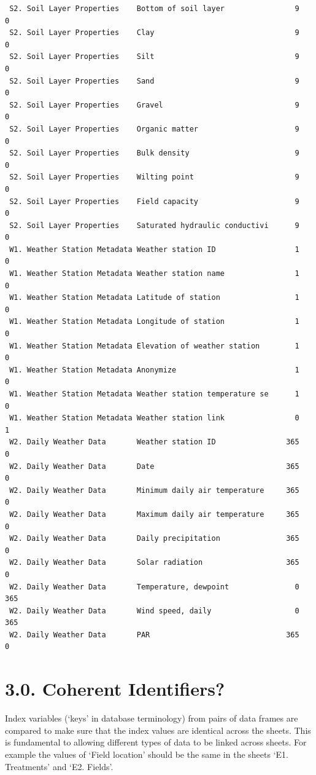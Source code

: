 \documentclass[
]{article}
\begin{document}
\begin{verbatim}
 S2. Soil Layer Properties    Bottom of soil layer                9       0
 S2. Soil Layer Properties    Clay                                9       0
 S2. Soil Layer Properties    Silt                                9       0
 S2. Soil Layer Properties    Sand                                9       0
 S2. Soil Layer Properties    Gravel                              9       0
 S2. Soil Layer Properties    Organic matter                      9       0
 S2. Soil Layer Properties    Bulk density                        9       0
 S2. Soil Layer Properties    Wilting point                       9       0
 S2. Soil Layer Properties    Field capacity                      9       0
 S2. Soil Layer Properties    Saturated hydraulic conductivi      9       0
 W1. Weather Station Metadata Weather station ID                  1       0
 W1. Weather Station Metadata Weather station name                1       0
 W1. Weather Station Metadata Latitude of station                 1       0
 W1. Weather Station Metadata Longitude of station                1       0
 W1. Weather Station Metadata Elevation of weather station        1       0
 W1. Weather Station Metadata Anonymize                           1       0
 W1. Weather Station Metadata Weather station temperature se      1       0
 W1. Weather Station Metadata Weather station link                0       1
 W2. Daily Weather Data       Weather station ID                365       0
 W2. Daily Weather Data       Date                              365       0
 W2. Daily Weather Data       Minimum daily air temperature     365       0
 W2. Daily Weather Data       Maximum daily air temperature     365       0
 W2. Daily Weather Data       Daily precipitation               365       0
 W2. Daily Weather Data       Solar radiation                   365       0
 W2. Daily Weather Data       Temperature, dewpoint               0     365
 W2. Daily Weather Data       Wind speed, daily                   0     365
 W2. Daily Weather Data       PAR                               365       0
\end{verbatim}

\newpage

\section{3.0. Coherent Identifiers?}\label{coherent-identifiers}

Index variables (`keys' in database terminology) from pairs of data
frames are compared to make sure that the index values are identical
across the sheets. This is fundamental to allowing different types of
data to be linked across sheets. For example the values of `Field
location' should be the same in the sheets `E1. Treatments' and `E2.
Fields'.
\end{document}

